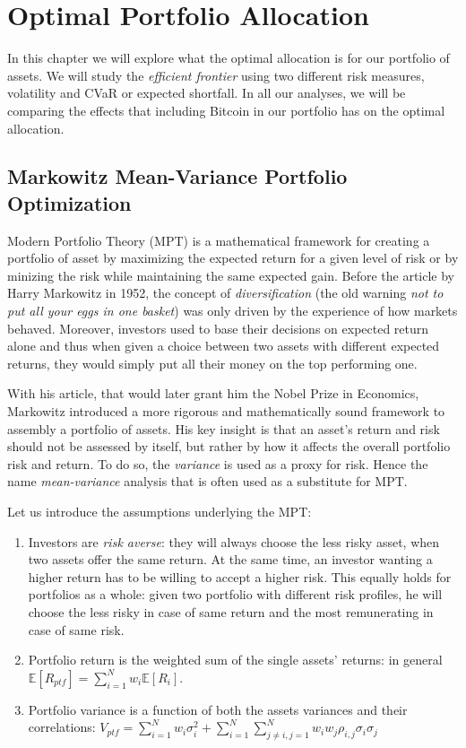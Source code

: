 \chapter{Optimal Portfolio Allocation}
\label{chpr:markowitz}

In this chapter we will explore what the optimal allocation is for our portfolio of assets. We will study the \textit{efficient frontier} using two different risk measures, volatility and CVaR or expected shortfall. In all our analyses, we will be comparing the effects that including Bitcoin in our portfolio has on the optimal allocation.


\section{Markowitz Mean-Variance Portfolio Optimization}
\label{sec:markowitz_theory}

Modern Portfolio Theory (MPT) is a mathematical framework for creating a portfolio of asset by maximizing the expected return for a given level of risk or by minizing the risk while maintaining the same expected gain. 
Before the article \citep{MARKOWITZ1952} by Harry Markowitz in 1952, the concept of \textit{diversification} (the old warning \textit{not to put all your eggs in one basket}) was only driven by the experience of how markets behaved.
Moreover, investors used to base their decisions on expected return alone and thus when given a choice between two assets with different expected returns, they would simply  put all their money on the top performing one.

With his article, that would later grant him the Nobel Prize in Economics, Markowitz introduced a more rigorous and mathematically sound framework to assembly a portfolio of assets. His key insight is that an asset's return and risk  should not be assessed by itself, but rather by how it affects the overall portfolio risk and return.
To do so, the \textit{variance} is used as a proxy for risk. Hence the name \textit{mean-variance } analysis that is often used as a substitute for MPT.

\bigskip
Let us introduce the assumptions underlying the MPT:
\begin{enumerate}
	\item Investors are \textit{risk averse}: they will always choose the less risky asset, when two assets offer the same return.  At the same time, an investor wanting a higher return has to be willing to accept a higher risk.
	This equally holds for portfolios as a whole: given two portfolio with different risk profiles, he will choose the less risky in case of same return and the most remunerating in case of same risk.
	\item Portfolio return is the weighted sum of the single assets' returns: in general $\mathbb{E}[R_{ptf}] = \sum_{i=1}^{N} w_i \mathbb{E}[R_i]$.
	\item Portfolio variance is a function of both the assets variances and their correlations: $V_{ptf} = \sum_{i=1}^{N} w_i \sigma_i^2 + \sum_{i=1}^{N}\sum_{j\neq i , j=1}^{N} w_i w_j \rho_{i,j}\sigma_i\sigma_j$
\end{enumerate}

